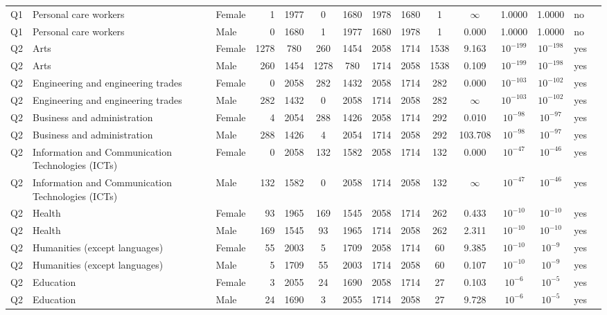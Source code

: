 \begin{longtable}{lllrcccccccccll}
Q1 & Personal care workers & Female & 1 & 1977 & 0 & 1680 & 1978 & 1680 & 1 & $\infty$ & 1.0000 & 1.0000 & no \\
Q1 & Personal care workers & Male & 0 & 1680 & 1 & 1977 & 1680 & 1978 & 1 & 0.000 & 1.0000 & 1.0000 & no \\
Q2 & Arts & Female & 1278 & 780 & 260 & 1454 & 2058 & 1714 & 1538 & 9.163 & $10^{-199}$ & $10^{-198}$ & yes \\
Q2 & Arts & Male & 260 & 1454 & 1278 & 780 & 1714 & 2058 & 1538 & 0.109 & $10^{-199}$ & $10^{-198}$ & yes \\
Q2 & Engineering and engineering trades & Female & 0 & 2058 & 282 & 1432 & 2058 & 1714 & 282 & 0.000 & $10^{-103}$ & $10^{-102}$ & yes \\
Q2 & Engineering and engineering trades & Male & 282 & 1432 & 0 & 2058 & 1714 & 2058 & 282 & $\infty$ & $10^{-103}$ & $10^{-102}$ & yes \\
Q2 & Business and administration & Female & 4 & 2054 & 288 & 1426 & 2058 & 1714 & 292 & 0.010 & $10^{-98}$ & $10^{-97}$ & yes \\
Q2 & Business and administration & Male & 288 & 1426 & 4 & 2054 & 1714 & 2058 & 292 & 103.708 & $10^{-98}$ & $10^{-97}$ & yes \\
Q2 & Information and Communication Technologies (ICTs) & Female & 0 & 2058 & 132 & 1582 & 2058 & 1714 & 132 & 0.000 & $10^{-47}$ & $10^{-46}$ & yes \\
Q2 & Information and Communication Technologies (ICTs) & Male & 132 & 1582 & 0 & 2058 & 1714 & 2058 & 132 & $\infty$ & $10^{-47}$ & $10^{-46}$ & yes \\
Q2 & Health & Female & 93 & 1965 & 169 & 1545 & 2058 & 1714 & 262 & 0.433 & $10^{-10}$ & $10^{-10}$ & yes \\
Q2 & Health & Male & 169 & 1545 & 93 & 1965 & 1714 & 2058 & 262 & 2.311 & $10^{-10}$ & $10^{-10}$ & yes \\
Q2 & Humanities (except languages) & Female & 55 & 2003 & 5 & 1709 & 2058 & 1714 & 60 & 9.385 & $10^{-10}$ & $10^{-9}$ & yes \\
Q2 & Humanities (except languages) & Male & 5 & 1709 & 55 & 2003 & 1714 & 2058 & 60 & 0.107 & $10^{-10}$ & $10^{-9}$ & yes \\
Q2 & Education & Female & 3 & 2055 & 24 & 1690 & 2058 & 1714 & 27 & 0.103 & $10^{-6}$ & $10^{-5}$ & yes \\
Q2 & Education & Male & 24 & 1690 & 3 & 2055 & 1714 & 2058 & 27 & 9.728 & $10^{-6}$ & $10^{-5}$ & yes \\

\end{longtable}
